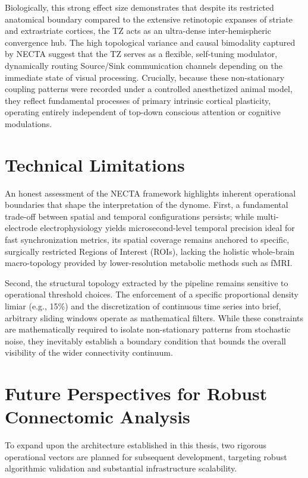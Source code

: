 Biologically, this strong effect size demonstrates that despite its restricted anatomical boundary compared to the extensive retinotopic expanses of striate and extrastriate cortices, the TZ acts as an ultra-dense inter-hemispheric convergence hub. The high topological variance and causal bimodality captured by NECTA suggest that the TZ serves as a flexible, self-tuning modulator, dynamically routing Source/Sink communication channels depending on the immediate state of visual processing. Crucially, because these non-stationary coupling patterns were recorded under a controlled anesthetized animal model, they reflect fundamental processes of primary intrinsic cortical plasticity, operating entirely independent of top-down conscious attention or cognitive modulations.

\section{Technical Limitations}
An honest assessment of the NECTA framework highlights inherent operational boundaries that shape the interpretation of the dynome. First, a fundamental trade-off between spatial and temporal configurations persists; while multi-electrode electrophysiology yields microsecond-level temporal precision ideal for fast synchronization metrics, its spatial coverage remains anchored to specific, surgically restricted Regions of Interest (ROIs), lacking the holistic whole-brain macro-topology provided by lower-resolution metabolic methods such as fMRI. 

Second, the structural topology extracted by the pipeline remains sensitive to operational threshold choices. The enforcement of a specific proportional density limiar (e.g., 15\%) and the discretization of continuous time series into brief, arbitrary sliding windows operate as mathematical filters. While these constraints are mathematically required to isolate non-stationary patterns from stochastic noise, they inevitably establish a boundary condition that bounds the overall visibility of the wider connectivity continuum.

\section{Future Perspectives for Robust Connectomic Analysis}
To expand upon the architecture established in this thesis, two rigorous operational vectors are planned for subsequent development, targeting robust algorithmic validation and substantial infrastructure scalability.

